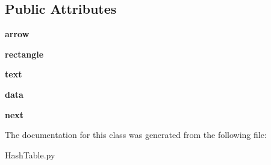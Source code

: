 \subsection*{Public Attributes}
\begin{DoxyCompactItemize}
\item 
\mbox{\label{class_hash_table_1_1_node_a3f91972e1143a4748b526bb5570856f7}} 
{\bfseries arrow}
\item 
\mbox{\label{class_hash_table_1_1_node_a73ffdb3a86bf302ded6aba74cbc01473}} 
{\bfseries rectangle}
\item 
\mbox{\label{class_hash_table_1_1_node_a0af917d73b04e760b355bb490ff83557}} 
{\bfseries text}
\item 
\mbox{\label{class_hash_table_1_1_node_a237c28e82c0a4e9319e0891ca952047b}} 
{\bfseries data}
\item 
\mbox{\label{class_hash_table_1_1_node_af4974a35d52ac27d9e98348fb9a09545}} 
{\bfseries next}
\end{DoxyCompactItemize}


The documentation for this class was generated from the following file\+:\begin{DoxyCompactItemize}
\item 
Hash\+Table.\+py\end{DoxyCompactItemize}
